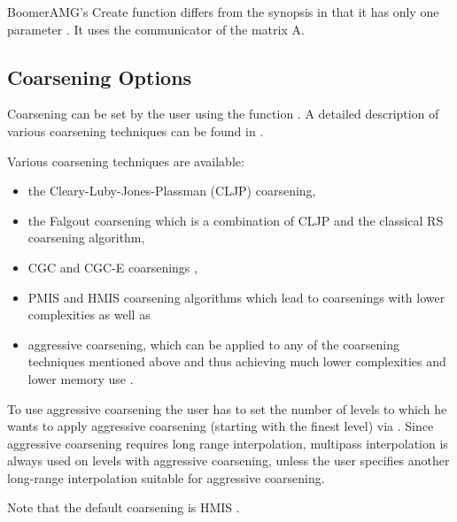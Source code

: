 BoomerAMG's Create function differs from the synopsis in that it has only one parameter
. It uses the communicator 
of the matrix A.


\subsection{Coarsening Options}

Coarsening can be set by the user using the function . A detailed description of various coarsening techniques can be found in \cite{VEHenson_UMYang_2002,UMYang_2005}.

Various coarsening techniques are available:
\begin{itemize}
\item the Cleary-Luby-Jones-Plassman (CLJP) coarsening,
\item the Falgout coarsening which is a combination of CLJP and the
classical RS coarsening algorithm,
\item CGC and CGC-E coarsenings \cite{Griebela_1, Griebel_2},
\item PMIS and HMIS coarsening algorithms which lead to coarsenings with lower complexities \cite{DeSterck_Yang_Heys_2004}
as well as
\item aggressive coarsening, which can be applied to any of the coarsening techniques mentioned above and thus achieving much lower complexities and lower memory use \cite{Stueben_1999}.
\end{itemize}
To use aggressive coarsening the user has to set the number of levels to which he wants to apply
aggressive coarsening (starting with the finest level) 
via . Since aggressive coarsening requires long range
interpolation, multipass interpolation is always used on levels with aggressive coarsening, unless the user specifies another long-range interpolation suitable for aggressive coarsening.

Note that the default coarsening is HMIS \cite{DeSterck_Yang_Heys_2004}.

